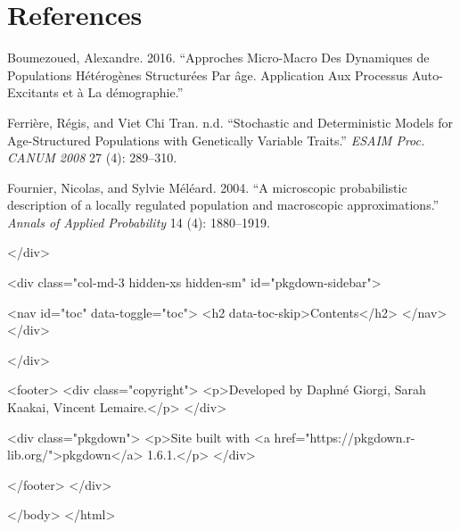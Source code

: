 \hypertarget{references}{%
\section{References}\label{references}}

\hypertarget{refs}{}
\begin{cslreferences}
\leavevmode\hypertarget{ref-boumezoued2016}{}%
Boumezoued, Alexandre. 2016. ``Approches Micro-Macro Des Dynamiques de Populations Hétérogènes Structurées Par âge. Application Aux Processus Auto-Excitants et à La démographie.''

\leavevmode\hypertarget{ref-MR2562651}{}%
Ferrière, Régis, and Viet Chi Tran. n.d. ``Stochastic and Deterministic Models for Age-Structured Populations with Genetically Variable Traits.'' \emph{ESAIM Proc. CANUM 2008} 27 (4): 289--310.

\leavevmode\hypertarget{ref-MELEARD2004}{}%
Fournier, Nicolas, and Sylvie Méléard. 2004. ``A microscopic probabilistic description of a locally regulated population and macroscopic approximations.'' \emph{Annals of Applied Probability} 14 (4): 1880--1919.
\end{cslreferences}
  </div>

  <div class="col-md-3 hidden-xs hidden-sm" id="pkgdown-sidebar">

        <nav id="toc" data-toggle="toc">
      <h2 data-toc-skip>Contents</h2>
    </nav>
      </div>

</div>



      <footer>
      <div class="copyright">
  <p>Developed by Daphné Giorgi, Sarah Kaakai, Vincent Lemaire.</p>
</div>

<div class="pkgdown">
  <p>Site built with <a href="https://pkgdown.r-lib.org/">pkgdown</a> 1.6.1.</p>
</div>

      </footer>
   </div>

  


  </body>
</html>

